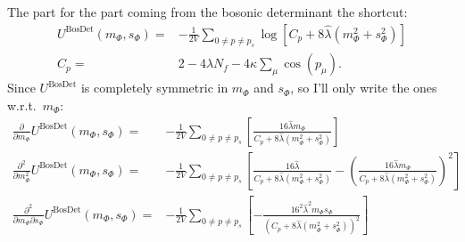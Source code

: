 The part for the part coming from the bosonic determinant the shortcut:
 \begin{align}\label{eq:CEP_bosonicDeterminantContribution_shortcut}
  U^{\text{BosDet}}(m_{\Phi},s_{\Phi}) =& - \frac{1}{2V}\sum\limits_{0 \neq p \neq p_s} \log \left[ C_p + 8 \hat \lambda \left(m_{\Phi}^2 + s_{\Phi}^2 \right) \right]
       \nonumber \\
   C_p                                 =&  2 - 4 \hat\lambda N_f - 4 \kappa \sum_{\mu} \cos(p_{\mu}).
 \end{align}
Since $U^{\text{BosDet}}$ is completely symmetric in $m_{\Phi}$ and $s_{\Phi}$, so I'll only write the ones w.r.t.\ $m_{\Phi}$:
\begin{align}\label{eq:CEP_derivative_dm_bosonicContribution}
 \frac{\partial }{\partial m_{\Phi}} U^{\text{BosDet}}(m_{\Phi}, s_{\Phi}) =& - \frac{1}{2V}\sum\limits_{0 \neq p \neq p_s} 
                   \left[  \frac{16 \hat\lambda  m_{\Phi} }{ C_p + 8 \hat\lambda \left( m_{\Phi}^2 + s_{\Phi}^2  \right) }  \right]
       \\ \label{eq:CEP_derivative_dmdm_bosonicContribution}
%        
 \frac{\partial^2 }{\partial m_{\Phi}^2} U^{\text{BosDet}}(m_{\Phi}, s_{\Phi}) =& - \frac{1}{2V}\sum\limits_{0 \neq p \neq p_s} 
                   \left[  \frac{16 \hat\lambda }{ C_p + 8 \hat\lambda \left( m_{\Phi}^2 + s_{\Phi}^2  \right) }
                   - \left( \frac{16 \hat\lambda m_{\Phi} }{ C_p + 8 \hat\lambda \left( m_{\Phi}^2 + s_{\Phi}^2  \right) } \right)^2    \right]
              \\ \label{eq:CEP_derivative_dmds_bosonicContribution}
%               
 \frac{\partial^2 }{\partial m_{\Phi}\partial s_{\Phi}} U^{\text{BosDet}}(m_{\Phi}, s_{\Phi}) =& - \frac{1}{2V}\sum\limits_{0 \neq p \neq p_s} 
                   \left[ - \frac{16^2 \hat\lambda^2 m_{\Phi} s_{\Phi} }{\left( C_p + 8 \hat\lambda \left( m_{\Phi}^2 + s_{\Phi}^2  \right)  \right)^2 }  \right]
\end{align}



